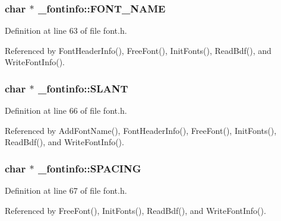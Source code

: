 \subsubsection[{\texorpdfstring{F\+O\+N\+T\+\_\+\+N\+A\+ME}{FONT_NAME}}]{\setlength{\rightskip}{0pt plus 5cm}char $\ast$ \+\_\+fontinfo\+::\+F\+O\+N\+T\+\_\+\+N\+A\+ME}\hypertarget{struct__fontinfo_a6c0f76f2668446a1c37ecab8d4e286a5}{}\label{struct__fontinfo_a6c0f76f2668446a1c37ecab8d4e286a5}


Definition at line 63 of file font.\+h.



Referenced by Font\+Header\+Info(), Free\+Font(), Init\+Fonts(), Read\+Bdf(), and Write\+Font\+Info().

\subsubsection[{\texorpdfstring{S\+L\+A\+NT}{SLANT}}]{\setlength{\rightskip}{0pt plus 5cm}char $\ast$ \+\_\+fontinfo\+::\+S\+L\+A\+NT}\hypertarget{struct__fontinfo_aff56d18df3b46ec10896d15ad3a2e164}{}\label{struct__fontinfo_aff56d18df3b46ec10896d15ad3a2e164}


Definition at line 66 of file font.\+h.



Referenced by Add\+Font\+Name(), Font\+Header\+Info(), Free\+Font(), Init\+Fonts(), Read\+Bdf(), and Write\+Font\+Info().

\subsubsection[{\texorpdfstring{S\+P\+A\+C\+I\+NG}{SPACING}}]{\setlength{\rightskip}{0pt plus 5cm}char $\ast$ \+\_\+fontinfo\+::\+S\+P\+A\+C\+I\+NG}\hypertarget{struct__fontinfo_a0e6fafc8f03c70ce9c506d7a506fbba4}{}\label{struct__fontinfo_a0e6fafc8f03c70ce9c506d7a506fbba4}


Definition at line 67 of file font.\+h.



Referenced by Free\+Font(), Init\+Fonts(), Read\+Bdf(), and Write\+Font\+Info().

